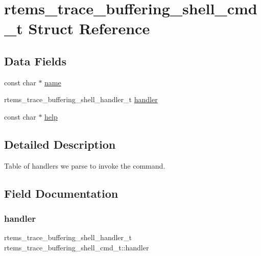 \hypertarget{structrtems__trace__buffering__shell__cmd__t}{}\section{rtems\+\_\+trace\+\_\+buffering\+\_\+shell\+\_\+cmd\+\_\+t Struct Reference}
\label{structrtems__trace__buffering__shell__cmd__t}
\subsection*{Data Fields}
\begin{DoxyCompactItemize}
\item 
const char $\ast$ \mbox{\hyperlink{structrtems__trace__buffering__shell__cmd__t_a27a42077816731552d5db31b8bca1aea}{name}}
\item 
rtems\+\_\+trace\+\_\+buffering\+\_\+shell\+\_\+handler\+\_\+t \mbox{\hyperlink{structrtems__trace__buffering__shell__cmd__t_ad7d5c17a53fbf209b8e408411b6816ef}{handler}}
\item 
const char $\ast$ \mbox{\hyperlink{structrtems__trace__buffering__shell__cmd__t_abecc68b0f3273da37487fe00eb4458bc}{help}}
\end{DoxyCompactItemize}


\subsection{Detailed Description}
Table of handlers we parse to invoke the command. 

\subsection{Field Documentation}
\mbox{\label{structrtems__trace__buffering__shell__cmd__t_ad7d5c17a53fbf209b8e408411b6816ef}} 
\subsubsection{\texorpdfstring{handler}{handler}}
{\footnotesize\ttfamily rtems\+\_\+trace\+\_\+buffering\+\_\+shell\+\_\+handler\+\_\+t rtems\+\_\+trace\+\_\+buffering\+\_\+shell\+\_\+cmd\+\_\+t\+::handler}

